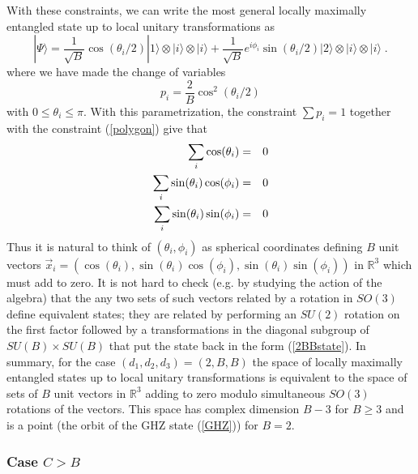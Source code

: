 \documentclass[12pt]{article}
\theoremstyle{definition}
\newcommand{\be}{\begin{equation}}
\newcommand{\ee}{\end{equation}}
\newcommand{\bea}{\begin{eqnarray}}
\newcommand{\eea}{\end{eqnarray}}
\begin{document}
With these constraints, we can write the most general locally maximally entangled state up to local unitary transformations as
\be
\label{2BBstate}
|\Psi \rangle = \frac{1}{\sqrt{B}} \cos(\theta_i /2) |1 \rangle  \otimes |i \rangle  \otimes |i \rangle + \frac{1}{\sqrt{B}} e^{i \phi_i} \sin(\theta_i /2) |2 \rangle  \otimes |i \rangle  \otimes |i \rangle  \; .
\ee
where we have made the change of variables
\be
p_i = \frac{2}{B} \cos^2(\theta_i/2)
\ee
with $0 \le \theta_i \le \pi$.
With this parametrization, the constraint $\sum p_i = 1$ together with the constraint (\ref{polygon}) give that
\bea
\sum_i \cos(\theta_i) &=& 0 \cr
\sum_i \sin(\theta_i) \cos(\phi_i) &=& 0 \cr
\sum_i \sin(\theta_i) \sin(\phi_i) &=& 0
\eea
Thus it is natural to think of $(\theta_i, \phi_i)$ as spherical coordinates defining $B$ unit vectors $\vec{x}_i = (\cos(\theta_i),\sin(\theta_i) \cos(\phi_i),\sin(\theta_i) \sin(\phi_i))$ in  $\mathbb{R}^3$ which must add to zero. It is not hard to check (e.g. by studying the action of the algebra) that the any two sets of such vectors related by a rotation in $SO(3)$ define equivalent states; they are related by performing an $SU(2)$ rotation on the first factor followed by a transformations in the diagonal subgroup of $SU(B) \times SU(B)$ that put the state back in the form (\ref{2BBstate}). In summary, for the case $(d_1,d_2,d_3) = (2,B,B)$ the space of locally maximally entangled states up to local unitary transformations is equivalent to the space of sets of $B$ unit vectors in $\mathbb{R}^3$ adding to zero modulo simultaneous $SO(3)$ rotations of the vectors. This space has complex dimension $B-3$ for $B \ge 3$ and is a point (the orbit of the GHZ state (\ref{GHZ})) for $B=2$.

\subsubsection*{Case $C>B$}
\end{document}
